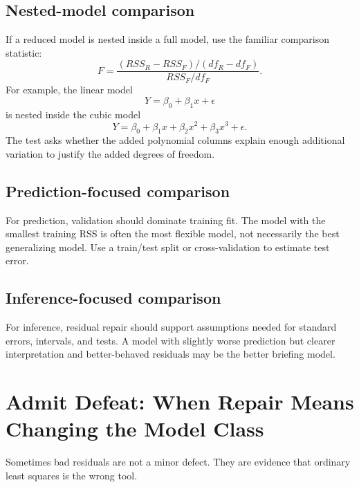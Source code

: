 \subsection*{Nested-model comparison}

If a reduced model is nested inside a full model, use the familiar comparison statistic:
\begin{equation}
  F=\frac{(RSS_R-RSS_F)/(df_R-df_F)}{RSS_F/df_F}.
\end{equation}
For example, the linear model
\begin{equation}
  Y=\beta_0+\beta_1x+\epsilon
\end{equation}
is nested inside the cubic model
\begin{equation}
  Y=\beta_0+\beta_1x+\beta_2x^2+\beta_3x^3+\epsilon.
\end{equation}
The test asks whether the added polynomial columns explain enough additional variation to justify the added degrees of freedom.

\subsection*{Prediction-focused comparison}

For prediction, validation should dominate training fit.  The model with the smallest training RSS is often the most flexible model, not necessarily the best generalizing model.  Use a train/test split or cross-validation to estimate test error.

\subsection*{Inference-focused comparison}

For inference, residual repair should support assumptions needed for standard errors, intervals, and tests.  A model with slightly worse prediction but clearer interpretation and better-behaved residuals may be the better briefing model.

\section{Admit Defeat: When Repair Means Changing the Model Class}

Sometimes bad residuals are not a minor defect.  They are evidence that ordinary least squares is the wrong tool.

